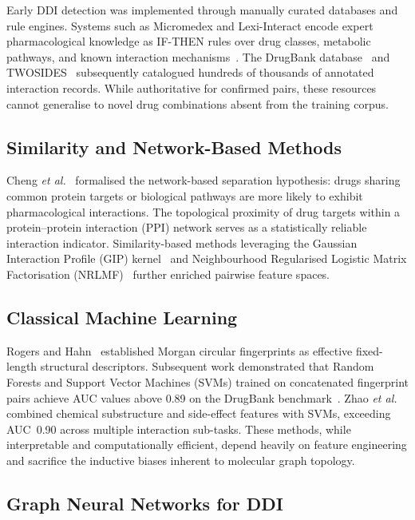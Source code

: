 \documentclass[conference]{IEEEtran}
\begin{document}
Early DDI detection was implemented through manually curated databases and rule engines.
Systems such as Micromedex and Lexi-Interact encode expert pharmacological knowledge as
IF-THEN rules over drug classes, metabolic pathways, and known interaction
mechanisms~\cite{becker2007ddi}. The DrugBank database~\cite{wishart2018drugbank5} and
TWOSIDES~\cite{tatonetti2012twosides} subsequently catalogued hundreds of thousands of
annotated interaction records. While authoritative for confirmed pairs, these resources
cannot generalise to novel drug combinations absent from the training corpus.

\subsection{Similarity and Network-Based Methods}

Cheng \textit{et al.}~\cite{cheng2012network} formalised the network-based separation
hypothesis: drugs sharing common protein targets or biological pathways are more likely
to exhibit pharmacological interactions. The topological proximity of drug targets within a
protein--protein interaction (PPI) network serves as a statistically reliable interaction
indicator. Similarity-based methods leveraging the Gaussian Interaction Profile (GIP)
kernel~\cite{vanlaarhoven2011gaussian} and Neighbourhood Regularised Logistic Matrix
Factorisation (NRLMF)~\cite{liu2016nrlmf} further enriched pairwise feature spaces.

\subsection{Classical Machine Learning}

Rogers and Hahn~\cite{rogers2010fingerprints} established Morgan circular fingerprints as
effective fixed-length structural descriptors. Subsequent work demonstrated that Random
Forests and Support Vector Machines (SVMs) trained on concatenated fingerprint pairs achieve
AUC values above 0.89 on the DrugBank benchmark~\cite{vilar2012detection}. Zhao
\textit{et al.}~\cite{zhao2011drug} combined chemical substructure and side-effect features
with SVMs, exceeding AUC~0.90 across multiple interaction sub-tasks. These methods, while
interpretable and computationally efficient, depend heavily on feature engineering and
sacrifice the inductive biases inherent to molecular graph topology.

\subsection{Graph Neural Networks for DDI}
\end{document}
